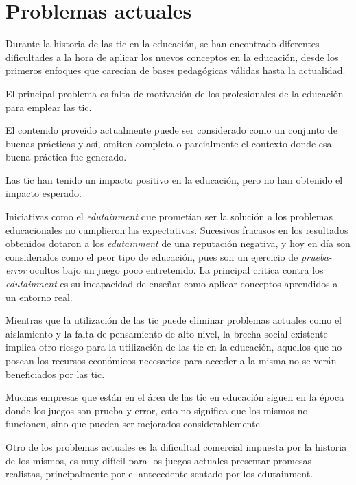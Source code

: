 \section{Problemas actuales}
\label{tics:problemas}

Durante la historia de las \Gls{tic} en la educación, se han encontrado
diferentes dificultades a la hora de aplicar los nuevos conceptos en la
educación, desde los primeros enfoques que carecían de bases pedagógicas válidas
hasta la actualidad.

El principal problema es falta de motivación de los profesionales de la
educación para emplear las \Gls{tic}\cite{punie:ict}\cite{ict:romeo}.

El contenido proveído actualmente puede ser considerado como un conjunto de
buenas prácticas\cite{punie:ict} y así, omiten completa o parcialmente el
contexto donde esa buena práctica fue generado.

Las \Gls{tic} han tenido un impacto positivo en la educación\cite{punie:ict},
pero no han obtenido el impacto esperado.

Iniciativas como el \emph{edutainment} que prometían ser la solución a los
problemas educacionales no cumplieron las expectativas. Sucesivos fracasos en
los resultados obtenidos dotaron a los \emph{edutainment} de una reputación
negativa, y hoy en día son considerados como el peor tipo de educación, pues son
un ejercicio de \emph{prueba-error} ocultos bajo un juego poco
entretenido\cite{resnick:2004}. La principal critica contra los
\emph{edutainment} es su incapacidad de enseñar como aplicar conceptos
aprendidos a un entorno real\cite{resnick:2004}.

Mientras que la utilización de las \Gls{tic} puede eliminar problemas actuales
como el aislamiento y la falta de pensamiento de alto nivel\cite{punie:ict}, la
brecha social existente implica otro riesgo para la utilización de las \Gls{tic}
en la educación, aquellos que no posean los recursos económicos necesarios para
acceder a la misma no se verán beneficiados por las \Gls{tic}\cite{punie:ict}.

Muchas empresas que están en el área de las \Gls{tic} en educación siguen en la
época donde los juegos son prueba y error, esto no significa que los mismos no
funcionen, sino que pueden ser mejorados
considerablemente\cite{egenfeldt2007third}.

Otro de los problemas actuales es la dificultad comercial impuesta por la
historia de los mismos, es muy difícil para los juegos actuales presentar
promesas realistas, principalmente por el antecedente sentado por los
edutainment\cite{egenfeldt2007third}.

